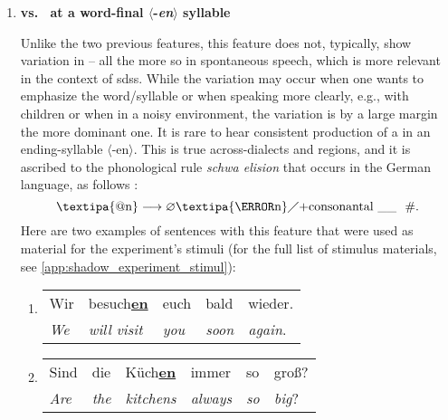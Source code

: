 \begin{enumerate}
	\item \textbf{\textipa{[@n]} vs.\ \textipa{[\s{n}]} at a word-final $\langle$-\textit{en}$\rangle$ syllable}
	
	Unlike the two previous features, this feature does not, typically, show variation in -- all the more so in spontaneous speech, which is more relevant in the context of \acp{sds}.
	While the \textipa{[@n]} variation may occur when one wants to emphasize the word/syllable or when speaking more clearly, e.g., with children or when in a noisy environment, the \textipa{[\s{n}]} variation is by a large margin the more dominant one.
	It is rare to hear consistent production of a \textipa{[@n]} in an ending-syllable $\langle$-en$\rangle$.
	This is true across-dialects and regions, and it is ascribed to the phonological rule \textit{schwa elision} that occurs in the German language, as follows \citep[adapted from][pp.~142--143]{Benware1986phonetics}:
	\begin{equation}
		\text{\textipa{@n}}\longrightarrow \varnothing \text{\textipa{\s{n}}} \diagup
		\text{+consonantal} \ \_\_ \ \ \text{\#} .
		\label{eq:schwa_elision_rule}
	\end{equation}
	Here are two examples of sentences with this feature that were used as material for the experiment's stimuli (for the full list of stimulus materials, see \cref{app:shadow_experiment_stimul}):
	
	\begin{enumerate}[label=\arabic{enumi}\alph*), ref=\arabic{enumi}\alph*.)]
		\item 
		\begin{tabulary}{\linewidth}{LLLLL}
			Wir 		& besuch\textbf{\underline{en}} & euch 		   & bald 		   & wieder.\\
			\textit{We} & \textit{will visit} 			& \textit{you} & \textit{soon} & \textit{again}.\\
		\end{tabulary}
		\item
		\begin{tabulary}{\linewidth}{LLLLLL}
			Sind 		 & die 			& Küch\textbf{\underline{en}} & immer		    & so 		  & groß?\\
			\textit{Are} & \textit{the} & \textit{kitchens} 		  & \textit{always} & \textit{so} & \textit{big}?\\
		\end{tabulary}
	\end{enumerate}
\end{enumerate}

